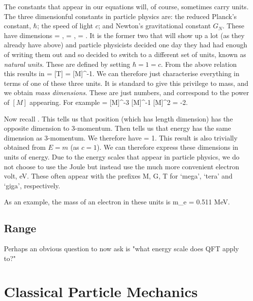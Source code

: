 The constants that appear in our equations will, of course, sometimes carry units. The three dimensionful constants in particle physics are: the reduced Planck's constant, $\hbar$; the speed of light $c$; and Newton's gravitational constant $G_N$. These have dimensions
\bse 
    [c] = \frac{[L]}{[T]}, \qquad [\hbar] = , \qand [G_N] = .
\ese 
It is the former two that will show up a lot (as they already have above) and particle physicists decided one day they had had enough of writing them out and so decided to switch to a different set of units, known as \textit{natural units}. These are defined by setting $\hbar=1=c$. From the above relation this results in 
\bse 
    [L] = [T] = [M]^{-1}.
\ese 
We can therefore just characterise everything in terms of one of these three units. It is standard to give this privilege to mass, and we obtain \textit{mass dimensions}. These are just numbers, and correspond to the power of $[M]$ appearing. For example 
\bse 
    [G_N] = [M]^{-3} [M]^{-1} [M]^{2} = -2.
\ese 

Now recall . This tells us that position (which has length dimension) has the opposite dimension to 3-momentum. Then  tells us that energy has the same dimension as 3-momentum. We therefore have 
\be 
    [E] = 1.
\ee 
This result is also trivially obtained from $E=m$ (as $c=1$). We can therefore express these dimensions in units of energy. Due to the energy scales that appear in particle physics, we do not choose to use the Joule but instead use the much more convenient electron volt, eV. These often appear with the prefixes M, G, T for `mega', `tera' and `giga', respectively.

\bex 
    As an example, the mass of an electron in these units is 
    \bse 
        m_{e} = 0.511 MeV.
    \ese
\eex 

\subsection{Range}

Perhaps an obvious question to now ask is "what energy scale does QFT apply to?" 


\section{Classical Particle Mechanics}

